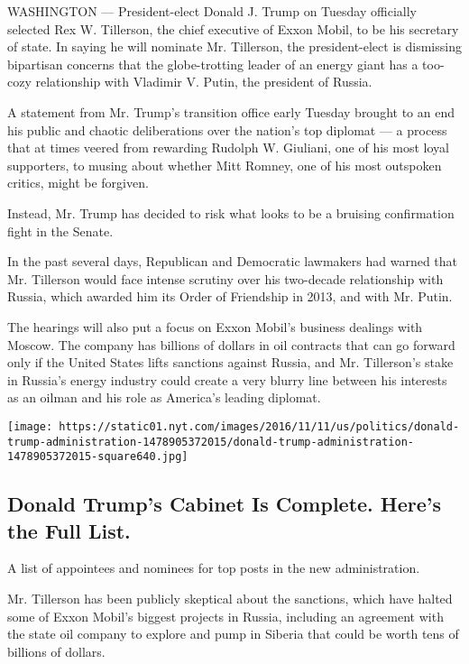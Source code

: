 WASHINGTON --- President-elect Donald J. Trump on Tuesday officially
selected Rex W. Tillerson, the chief executive of Exxon Mobil, to be his
secretary of state. In saying he will nominate Mr. Tillerson, the
president-elect is dismissing bipartisan concerns that the
globe-trotting leader of an energy giant has a too-cozy relationship
with Vladimir V. Putin, the president of Russia.

A statement from Mr. Trump's transition office early Tuesday brought to
an end his public and chaotic deliberations over the nation's top
diplomat --- a process that at times veered from rewarding Rudolph W.
Giuliani, one of his most loyal supporters, to musing about whether Mitt
Romney, one of his most outspoken critics, might be forgiven.

Instead, Mr. Trump has decided to risk what looks to be a bruising
confirmation fight in the Senate.

In the past several days, Republican and Democratic lawmakers had warned
that Mr. Tillerson would face intense scrutiny over his two-decade
relationship with Russia, which awarded him its Order of Friendship in
2013, and with Mr. Putin.

The hearings will also put a focus on Exxon Mobil's business dealings
with Moscow. The company has billions of dollars in oil contracts that
can go forward only if the United States lifts sanctions against Russia,
and Mr. Tillerson's stake in Russia's energy industry could create a
very blurry line between his interests as an oilman and his role as
America's leading diplomat.

\href{https://www.nytimes.com/interactive/2016/us/politics/donald-trump-administration.html}{}

\texttt{[image: https://static01.nyt.com/images/2016/11/11/us/politics/donald-trump-administration-1478905372015/donald-trump-administration-1478905372015-square640.jpg]}

\hypertarget{donald-trumps-cabinet-is-complete-heres-the-full-list}{%
\subsection{Donald Trump's Cabinet Is Complete. Here's the Full
List.}\label{donald-trumps-cabinet-is-complete-heres-the-full-list}}

A list of appointees and nominees for top posts in the new
administration.

Mr. Tillerson has been publicly skeptical about the sanctions, which
have halted some of Exxon Mobil's biggest projects in Russia, including
an agreement with the state oil company to explore and pump in Siberia
that could be worth tens of billions of dollars.

